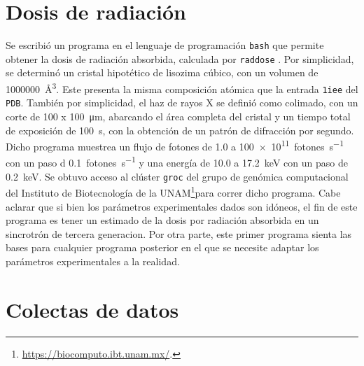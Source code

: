 \section{Dosis de radiación}
Se escribió un programa en el lenguaje de programación \verb|bash| que permite obtener la dosis de radiación absorbida,  calculada por \verb|raddose| \cite{Bury2018}. Por simplicidad, se determinó un cristal hipotético de lisozima cúbico, con un volumen de \SI{1000000}{\cubic\angstrom}. Este presenta la misma composición atómica que la entrada \verb|1iee| del \verb|PDB|. También por simplicidad, el haz de rayos X se definió como colimado, con un corte de \num{100} x  \SI{100}{\micro\meter}, abarcando el área completa del cristal y un tiempo total de exposición de \SI{100}{\second}, con la obtención de un patrón de difracción por segundo. Dicho programa muestrea un flujo de fotones de 1.0 a \SI{100e11}{fotones\per\second} con un paso d \SI{0.1}{fotones\per\second} y una energía de 10.0 a \SI{17.2}{\kilo\electronvolt} con un paso de \SI{0.2}{\kilo\electronvolt}. Se obtuvo acceso al clúster \verb|groc| del grupo de genómica computacional del Instituto de Biotecnología de la UNAM\footnote{\url{https://biocomputo.ibt.unam.mx/}.}para correr dicho programa. Cabe aclarar que si bien los parámetros experimentales dados son idóneos, el fin de este programa es tener un estimado de la dosis por radiación absorbida en un sincrotrón de tercera generacion. Por otra parte, este primer programa sienta las bases para cualquier programa posterior en el que se necesite adaptar los parámetros experimentales a la realidad.

\section{Colectas de datos} 
